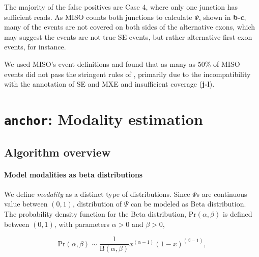 \clearpage


The majority of the false positives are Case 4, where only one junction has sufficient reads. As MISO counts both junctions to calculate $\Psi$, shown in \textbf{b-c}, many of the events are not covered on both sides of the alternative exons, which may suggest the events are not true SE events, but rather alternative first exon events, for instance.

We used MISO's event definitions and found that as many as 50\% of MISO events did not pass the stringent rules of \outrigger, primarily due to the incompatibility with the annotation of SE and MXE and insufficient coverage (\textbf{j-l}).


\section{\texttt{anchor}: Modality estimation}
\label{sec:anchor}

\subsection{Algorithm overview}
\paragraph{Model modalities as beta distributions}

We define \emph{modality} as a distinct type of distributions. Since $\Psi$s are continuous value between $(0, 1)$, distribution of $\Psi$ can be modeled as Beta distribution. The probability density function for the Beta distribution, $\mathrm{Pr}(\alpha, \beta)$ is defined between $(0, 1)$, with parameters $\alpha > 0$ and $\beta > 0$,

\begin{equation}
\mathrm{Pr}(\alpha, \beta) \sim \frac{1}{\mathrm{B}\left(\alpha, \beta\right)}  x^{(\alpha - 1)} \left(1-x\right)^{(\beta-1)},
\end{equation}

